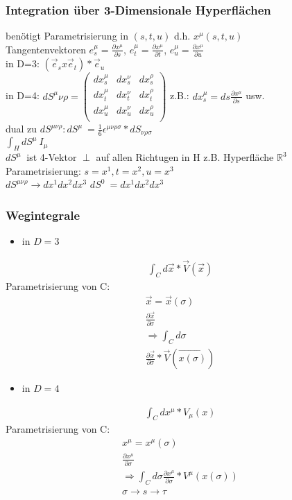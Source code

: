 \documentclass[a4paper]{article}
\begin{document}
\subsubsection{Integration über 3-Dimensionale Hyperflächen}
benötigt Parametrisierung in $(s,t,u)$ d.h. $x^\mu(s,t,u)$\\
Tangentenvektoren $e^\mu_s=\frac{\partial x^\mu}{\partial s}$,
$e^\mu_t=\frac{\partial x^\mu}{\partial t}$, $e^\mu_u=\frac{\partial
x^\mu}{\partial u}$\\
in D=3: $(\vec{e}_s x \vec{e}_t) * \vec{e}_u$\\
in D=4: $dS^\mu\nu\rho=\begin{pmatrix} 
dx^\mu_s & dx^\nu_s & dx^\rho_s \\
dx^\mu_t & dx^\nu_t & dx^\rho_t \\ 
dx^\mu_u & dx^\nu_u & dx^\rho_u \\\end{pmatrix}
$
z.B.: $dx^\mu_s=ds\frac{\partial x^\mu}{\partial s}$ usw.\\
dual zu $dS^{\mu\nu\rho}: dS^\mu~=\frac{1}{6}
\epsilon^{\mu\nu\rho\sigma}*dS_{\nu\rho\sigma}$\\
$\int_H dS^\mu~ I_\mu$\\
$dS^\mu~$ ist 4-Vektor
$\perp$ auf allen Richtugen in H
z.B. Hyperfläche $\mathbb{R}^3$
Parametrisierung: $s=x^1,t=x^2,u=x^3$\\
$dS^{\mu\nu\rho}\rightarrow dx^1dx^2dx^3$
$dS^{0}~=dx^1dx^2dx^3$


\subsubsection{Wegintegrale}
\begin{itemize}
  \item in $D=3$
\end{itemize}
\begin{align}
\int_C d\vec{x}*\vec{V}(\vec{x})
\end{align}
Parametrisierung von C:
\begin{align}
\vec{x}=\vec{x}(\sigma)\\
\frac{\partial\vec{x}}{\partial\sigma}\\
\Rightarrow\int_C d\sigma\\
\frac{\partial\vec{x}}{\partial\sigma}*\vec{V}(\vec{x(\sigma)})
\end{align}

\begin{itemize}
  \item in $D=4$
\end{itemize}
\begin{align}
\int_C dx^\mu*V_\mu(x)
\end{align}
Parametrisierung von C:
\begin{align}
x^\mu=x^\mu(\sigma)\\
\frac{\partial x^\mu}{\partial\sigma}\\
\Rightarrow\int_C d\sigma \frac{\partial x^\mu}{\partial\sigma}*
V^\mu(x(\sigma))\\
\sigma\rightarrow s \rightarrow\tau
\end{align}
\end{document}
